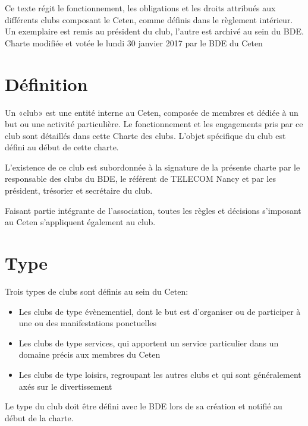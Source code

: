 \documentclass{article}
\begin{document}
\begin{titlepage}
		\vfill
		\begin{center}
			{\footnotesize \light{} Ce texte régit le fonctionnement, les
			obligations et les droits attribués aux différents clubs composant
			le Ceten, comme définis dans le règlement intérieur. Un exemplaire
			est remis au président du club, l’autre est archivé au sein du
			BDE\@.\\
			Charte modifiée et votée le lundi 30 janvier 2017 par le BDE du
			Ceten}
		\end{center}
	\end{titlepage}



	\begin{multicols}{2}
		
		\section{Définition}
\label{sec:definition}
			
		{\small
			
			Un «club» est une entité interne au Ceten, composée de membres et
			dédiée à un but ou une activité particulière. Le fonctionnement et
			les engagements pris par ce club sont détaillés dans cette Charte
			des clubs. L’objet spécifique du club est défini au début de cette
			charte.

			L'existence de ce club est subordonnée à la signature de la présente
			charte par le responsable des clubs du BDE, le référent de TELECOM
			Nancy et par les président, trésorier et secrétaire du club.

			Faisant partie intégrante de l’association, toutes les règles et
			décisions s’imposant au Ceten s’appliquent également au club.
			
		}

		\section{Type}
\label{sec:type}
			
		{\small
		
			Trois types de clubs sont définis au sein du Ceten:
			\begin{itemize}
				\item Les clubs de type évènementiel, dont le but est
					d’organiser ou de participer à une ou des manifestations
					ponctuelles
				\item Les clubs de type services, qui apportent un service
					particulier dans un domaine précis aux membres du Ceten
				\item Les clubs de type loisirs, regroupant les autres clubs et
					qui sont généralement axés sur le divertissement
			\end{itemize}
			Le type du club doit être défini avec le BDE lors de sa création et
			notifié au début de la charte.
			
}
\end{multicols}
\end{document}
